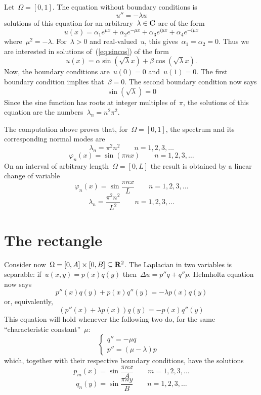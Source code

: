 Let~$\Omega=[0,1]$.  The equation without boundary conditions is
\begin{equation}\label{eq:sincos}
	u''=-\lambda u
\end{equation}
solutions of this equation for an arbitrary~$\lambda\in\mathbf{C}$ are of the form
\[
	u(x)=
	\alpha_1 e^{\mu x}
	+
	\alpha_2 e^{-\mu x}
	+
	\alpha_3 e^{i\mu x}
	+
	\alpha_4 e^{-i\mu x}
\]
where~$\mu^2=-\lambda$.  For~$\lambda>0$ and real-valued~$u$, this
gives~$\alpha_1=\alpha_2=0$.  Thus  we are interested in solutions
of~(\ref{eq:sincos}) of the form
\[
	u(x)=\alpha\sin\left(\sqrt{\lambda}
	x\right)+\beta\cos\left(\sqrt{\lambda}x\right).
\]
Now, the boundary conditions are~$u(0)=0$ and~$u(1)=0$.  The first
boundary condition implies that~$\beta=0$.  The second boundary
condition now says
\begin{equation}\label{eq:sinroots}
	\sin\left(\sqrt{\lambda}\right) = 0
\end{equation}
Since the sine function has roots at integer multiples of~$\pi$, the
solutions of this equation are the numbers~$\lambda_n=n^2\pi^2$.

The computation above proves that, for~$\Omega=[0,1]$, the
spectrum and its corresponding normal modes are
\[
	\lambda_n = \pi^2n^2
	\qquad n=1,2,3,\ldots
\]
\[
	\varphi_n(x) = \sin\left(\pi n x\right)
	\qquad n=1,2,3,\ldots
\]
On an interval of arbitrary length~$\Omega=[0,L]$ the result is
obtained by a linear change of variable
\[
	\varphi_n(x) = \sin\frac{\pi n x}L
	\qquad n=1,2,3,\ldots
\]
\[
	\lambda_n = \frac{\pi^2n^2}{L^2}
	\qquad n=1,2,3,\ldots
\]


\clearpage
\section{The rectangle}

Consider now~$\Omega=[0,A]\times[0,B]\subseteq\mathbf{R}^2$.
The Laplacian in two variables is separable: if~$u(x,y)=p(x)q(y)$
then~$\Delta u = p''q + q''p$.
Helmholtz equation now says
\[
	p''(x)q(y)+p(x)q''(y)=-\lambda p(x)q(y)
\]
or, equivalently,
\[
	\left(p''(x)+\lambda p(x)\right)q(y) = -p(x)q''(y)
\]
This equation will hold whenever the following two do, for the same
``characteristic constant''~$\mu$:
\[
	\begin{cases}
		q'' = -\mu q & \\
		p'' = (\mu-\lambda) p
	\end{cases}
\]
which, together with their respective boundary conditions, have the solutions
\[
	p_m(x) = \sin\frac{\pi n x}{A} \qquad m=1,2,3,\ldots
\]
\[
	q_n(y) = \sin\frac{\pi n y}{B} \qquad n=1,2,3,\ldots
\]

